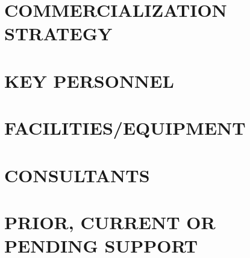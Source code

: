 \documentclass[letterpaper,11pt,onecolumn]{article}
\begin{document}
\section{COMMERCIALIZATION STRATEGY}

\section{KEY PERSONNEL}

\section{FACILITIES/EQUIPMENT}

\section{CONSULTANTS}

\section{PRIOR, CURRENT OR PENDING SUPPORT}



\end{document}
